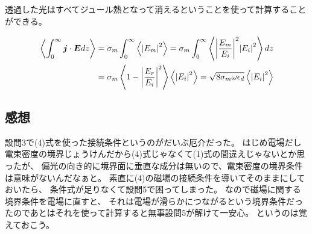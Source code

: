 \documentclass[../../master.tex]{subfiles}
\begin{document}
\subsection{}
透過した光はすべてジュール熱となって消えるということを使って計算することができる。

\begin{equation}\begin{aligned}[b]
    \ev{\int_{0}^{\infty}\vb*{j}\cdot \vb*{E}dz}
    &= \sigma_m \int_{0}^{\infty} \ev{\abs{E_m}^2}
    = \sigma_m \int_{0}^{\infty} \ev{\abs{\frac{E_m}{E_i}}^2\abs{E_i}^2}dz\\
    &= \sigma_m  \ev{1-\abs{\frac{E_r}{E_i}}^2}\ev{\abs{E_i}^2}
    = \sqrt{8\sigma_m \omega \epsilon_d}\ev{\abs{E_i}^2}
\end{aligned}\end{equation}

\subsection*{感想}
設問3で(4)式を使った接続条件というのがだいぶ厄介だった。
はじめ電場だし電束密度の境界じょうけんだから(4)式じゃなくて(1)式の間違えじゃないとか思ったが、
偏光の向き的に境界面に垂直な成分は無いので、電束密度の境界条件は意味がないんだなぁと。
素直に(4)の磁場の接続条件を導いてそのままにしておいたら、
条件式が足りなくて設問5で困ってしまった。
なので磁場に関する境界条件を電場に直すと、
それは電場が滑らかにつながるという境界条件だったのであとはそれを使って計算すると無事設問5が解けて一安心。
というのは覚えておこう。
\end{document}
